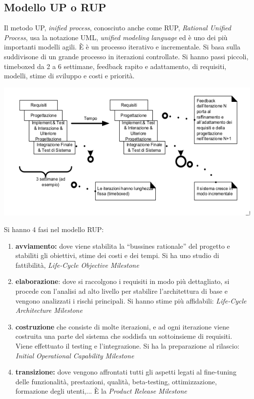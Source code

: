 \documentclass[a4paper,12pt, oneside]{book}
\begin{document}
\subsection{Modello UP o RUP}
Il metodo UP, \textit{inified process}, conosciuto anche come RUP, \textit{Rational Unified Process}, usa la notazione UML, \textit{unified modeling language} ed è uno dei più importanti modelli agili. È è un processo iterativo e incrementale. Si basa sulla suddivisone di un grande processo in iterazioni controllate. Si hanno passi piccoli, timeboxed da 2 a 6 settimane, feedback rapito e adattamento, di requisiti, modelli, stime di sviluppo e costi e priorità.
\begin{center}
\includegraphics[scale=0.7]{img/ms4.png}
\end{center}
Si hanno 4 fasi nel modello RUP:
\begin{enumerate}
\item \textbf{avviamento:} dove viene stabilita la “bussines rationale” del progetto e stabiliti gli obiettivi, stime dei costi e dei tempi. Si ha uno studio di fattibilità, \textit{Life-Cycle Objective Milestone}
\item \textbf{elaborazione}: dove si raccolgono i requisiti in modo più dettagliato, si procede con l'analisi ad alto livello per stabilire l'architettura di base e vengono analizzati i rischi principali. Si hanno stime più affidabili: \textit{Life-Cycle Architecture Milestone}
\item \textbf{costruzione} che consiste di molte iterazioni, e ad ogni iterazione viene costruita una parte del sistema che soddisfa un sottoinsieme di requisiti. Viene effettuato il testing e l'integrazione. Si ha la preparazione al rilascio: \textit{Initial Operational Capability Milestone}
\item \textbf{transizione:} dove vengono affrontati tutti gli aspetti legati al fine-tuning delle funzionalità,
prestazioni, qualità, beta-testing, ottimizzazione, formazione degli
utenti,... È la \textit{Product Release Milestone}
\end{enumerate}
\end{document}
